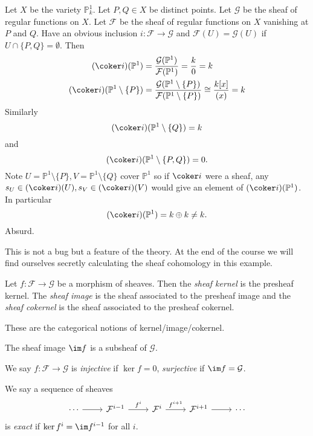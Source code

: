 \documentclass[a4paper]{article}
\renewcommand*{\P}{\mathbb{P}}
\newcommand{\sh}[1]{\mathcal{#1}} %
\begin{document}
\begin{eg}
  Let \(X\) be the variety \(\P^1_k\). Let \(P, Q \in X\) be distinct points. Let \(\sh G\) be the sheaf of regular functions on \(X\). Let \(\sh F\) be the sheaf of regular functions on \(X\) vanishing at \(P\) and \(Q\). Have an obvious inclusion \(i: \sh F \to \sh G\) and \(\sh F(U) = \sh G(U)\) if \(U \cap \{P, Q\} = \emptyset\). Then
  \begin{align*}
    (\coker i) (\P^1) &= \frac{\sh G (\P^1)}{\sh F(\P^1)} = \frac{k}{0} = k \\
    (\coker i) (\P^1 \setminus \{P\}) &= \frac{\sh G (\P^1 \setminus \{P\})}{\sh F (\P^1 \setminus \{P\})} \cong \frac{k[x]}{(x)} = k
  \end{align*}
  Similarly
  \[
    (\coker i) (\P^1 \setminus \{Q\}) = k
  \]
  and
  \[
    (\coker i) (\P^1 \setminus \{P, Q\}) = 0.
  \]
  Note \(U = \P^1 \setminus \{P\}, V = \P^1 \setminus \{Q\}\) cover \(\P^1\) so if \(\coker i\) were a sheaf, any \(s_U \in (\coker i)(U), s_V \in (\coker i)(V)\) would give an element of \((\coker i)(\P^1)\). In particular
  \[
    (\coker i) (\P^1) = k \oplus k \neq k.
  \]
  Absurd.

  This is not a bug but a feature of the theory. At the end of the course we will find ourselves secretly calculating the sheaf cohomology in this example.
\end{eg}

\begin{definition}
  Let \(f: \sh F \to \sh G\) be a morphism of sheaves. Then the \emph{sheaf kernel} is the presheaf kernel. The \emph{sheaf image} is the sheaf associated to the presheaf image and the \emph{sheaf cokernel} is the sheaf associated to the presheaf cokernel.
\end{definition}

These are the categorical notions of kernel/image/cokernel.

\begin{ex}
  The sheaf image \(\im f\) is a subsheaf of \(\sh G\).
\end{ex}

\begin{definition}
  We say \(f: \sh F \to \sh G\) is \emph{injective} if \(\ker f = 0\), \emph{surjective} if \(\im f = \sh G\).

  We say a sequence of sheaves
  \[
    \begin{tikzcd}
      \cdots \ar[r] & \sh F^{i - 1} \ar[r, "f^i"] & \sh F^i \ar[r, "f^{i + 1}"] & \sh F^{i + 1} \ar[r] & \cdots
    \end{tikzcd}
  \]
  is \emph{exact} if \(\ker f^i = \im f^{i - 1}\) for all \(i\).
\end{definition}
\end{document}
